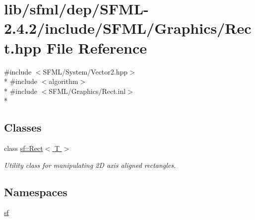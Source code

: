 \hypertarget{sfml_2dep_2_s_f_m_l-2_84_82_2include_2_s_f_m_l_2_graphics_2_rect_8hpp}{\section{lib/sfml/dep/\-S\-F\-M\-L-\/2.4.2/include/\-S\-F\-M\-L/\-Graphics/\-Rect.hpp File Reference}
\label{sfml_2dep_2_s_f_m_l-2_84_82_2include_2_s_f_m_l_2_graphics_2_rect_8hpp}
}
{\ttfamily \#include $<$S\-F\-M\-L/\-System/\-Vector2.\-hpp$>$}\\*
{\ttfamily \#include $<$algorithm$>$}\\*
{\ttfamily \#include $<$S\-F\-M\-L/\-Graphics/\-Rect.\-inl$>$}\\*
\subsection*{Classes}
\begin{DoxyCompactItemize}
\item 
class \hyperlink{classsf_1_1_rect}{sf\-::\-Rect$<$ T $>$}
\begin{DoxyCompactList}\small\item\em Utility class for manipulating 2\-D axis aligned rectangles. \end{DoxyCompactList}\end{DoxyCompactItemize}
\subsection*{Namespaces}
\begin{DoxyCompactItemize}
\item 
\hyperlink{namespacesf}{sf}
\end{DoxyCompactItemize}
